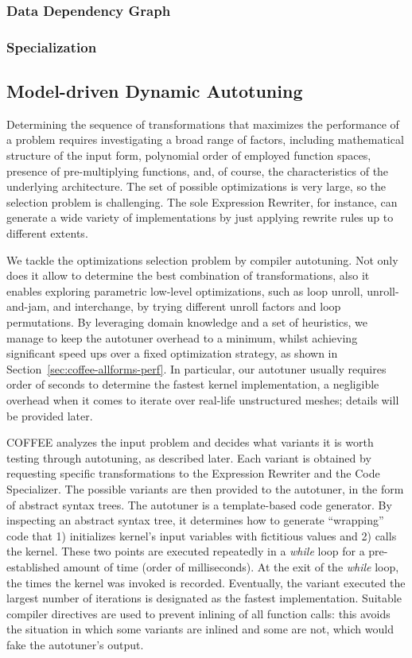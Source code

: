 \subsubsection{Data Dependency Graph}


\subsubsection{Specialization}

\subsection{Model-driven Dynamic Autotuning}
\label{sec:coffee-autotune}

Determining the sequence of transformations that maximizes the performance of a problem requires investigating a broad range of factors, including mathematical structure of the input form, polynomial order of employed function spaces, presence of pre-multiplying functions, and, of course, the characteristics of the underlying architecture. The set of possible optimizations is very large, so the selection problem is challenging. The sole Expression Rewriter, for instance, can generate a wide variety of implementations by just applying rewrite rules up to different extents.  

We tackle the optimizations selection problem by compiler autotuning. Not only does it allow to determine the best combination of transformations, also it enables exploring parametric low-level optimizations, such as loop unroll, unroll-and-jam, and interchange, by trying different unroll factors and loop permutations. By leveraging domain knowledge and a set of heuristics, we manage to keep the autotuner overhead to a minimum, whilst achieving significant speed ups over a fixed optimization strategy, as shown in Section~\ref{sec:coffee-allforms-perf}. In particular, our autotuner usually requires order of seconds to determine the fastest kernel implementation, a negligible overhead when it comes to iterate over real-life unstructured meshes; details will be provided later.

COFFEE analyzes the input problem and decides what variants it is worth testing through autotuning, as described later. Each variant is obtained by requesting specific transformations to the Expression Rewriter and the Code Specializer. The possible variants are then provided to the autotuner, in the form of abstract syntax trees. The autotuner is a template-based code generator. By inspecting an abstract syntax tree, it determines how to generate ``wrapping'' code that 1) initializes kernel's input variables with fictitious values and 2) calls the kernel. These two points are executed repeatedly in a \emph{while} loop for a pre-established amount of time (order of milliseconds). At the exit of the \emph{while} loop, the times the kernel was invoked is recorded. Eventually, the variant executed the largest number of iterations is designated as the fastest implementation. Suitable compiler directives are used to prevent inlining of all function calls: this avoids the situation in which some variants are inlined and some are not, which would fake the autotuner's output. 

